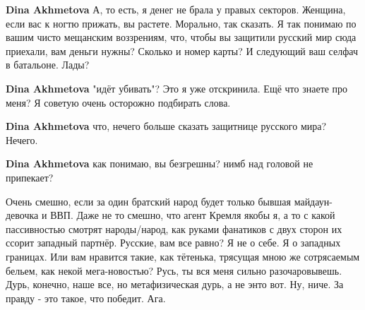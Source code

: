 \begin{itemize}
\begin{itemize}
\textbf{Dina Akhmetova} А, то есть, я денег не брала у правых секторов. Женщина, если вас к ногтю прижать, вы растете. Морально, так сказать. Я так понимаю по вашим чисто мещанским воззрениям, что, чтобы вы защитили русский мир сюда приехали, вам деньги нужны? Сколько и номер карты? И следующий ваш селфач в батальоне. Лады?

 
\textbf{Dina Akhmetova} "идёт убивать"? Это я уже отскринила. Ещё что знаете про меня? Я советую очень осторожно подбирать слова.

 
\textbf{Dina Akhmetova} что, нечего больше сказать защитнице русского мира? Нечего.

 
\textbf{Dina Akhmetova} как понимаю, вы безгрешны? нимб над головой не припекает?

\end{itemize}

 

Очень смешно, если за один братский народ будет только бывшая майдаун-девочка и
ВВП. Даже не то смешно, что агент Кремля якобы я, а то с какой пассивностью
смотрят народы/народ, как руками фанатиков с двух сторон их ссорит западный
партнёр. Русские, вам все равно? Я не о себе. Я о западных границах. Или вам
нравится такие, как тётенька, трясущая мною же сотрясаемым бельем, как некой
мега-новостью? Русь, ты вся меня сильно разочаровывешь. Дурь, конечно, наше
все, но метафизическая дурь, а не энто вот. Ну, ниче. За правду - это такое,
что победит. Ага.



\end{itemize}
